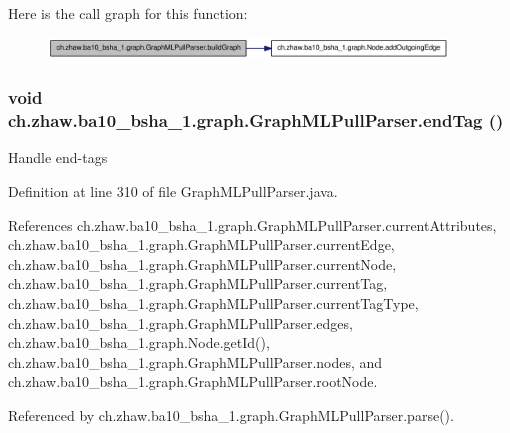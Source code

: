 Here is the call graph for this function:\nopagebreak
\begin{figure}[H]
\begin{center}
\leavevmode
\includegraphics[width=301pt]{classch_1_1zhaw_1_1ba10__bsha__1_1_1graph_1_1GraphMLPullParser_a5725aeb6453b75f4a0e7166bf4fe1023_cgraph}
\end{center}
\end{figure}
\hypertarget{classch_1_1zhaw_1_1ba10__bsha__1_1_1graph_1_1GraphMLPullParser_ae57851701120dd3a6c241c4057f88f34}{
\subsubsection[{endTag}]{\setlength{\rightskip}{0pt plus 5cm}void ch.zhaw.ba10\_\-bsha\_\-1.graph.GraphMLPullParser.endTag ()}}
\label{classch_1_1zhaw_1_1ba10__bsha__1_1_1graph_1_1GraphMLPullParser_ae57851701120dd3a6c241c4057f88f34}
Handle end-\/tags 

Definition at line 310 of file GraphMLPullParser.java.

References ch.zhaw.ba10\_\-bsha\_\-1.graph.GraphMLPullParser.currentAttributes, ch.zhaw.ba10\_\-bsha\_\-1.graph.GraphMLPullParser.currentEdge, ch.zhaw.ba10\_\-bsha\_\-1.graph.GraphMLPullParser.currentNode, ch.zhaw.ba10\_\-bsha\_\-1.graph.GraphMLPullParser.currentTag, ch.zhaw.ba10\_\-bsha\_\-1.graph.GraphMLPullParser.currentTagType, ch.zhaw.ba10\_\-bsha\_\-1.graph.GraphMLPullParser.edges, ch.zhaw.ba10\_\-bsha\_\-1.graph.Node.getId(), ch.zhaw.ba10\_\-bsha\_\-1.graph.GraphMLPullParser.nodes, and ch.zhaw.ba10\_\-bsha\_\-1.graph.GraphMLPullParser.rootNode.

Referenced by ch.zhaw.ba10\_\-bsha\_\-1.graph.GraphMLPullParser.parse().

